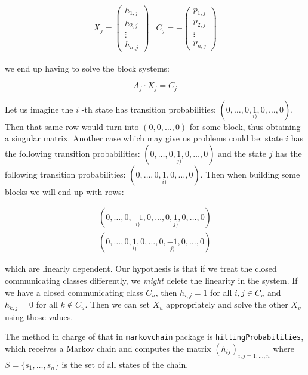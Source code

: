 \documentclass[
  nojss]{jss}
\begin{document}
\begin{equation*}
\begin{array}{lr}
X_j = \left(\begin{array}{c}
h_{1,j} \\
h_{2,j} \\
\vdots  \\
h_{n,j}
\end{array}\right) &
C_j = - \left(\begin{array}{c}
p_{1,j} \\
p_{2,j} \\
\vdots  \\
p_{n,j}
\end{array}\right)
\end{array}
\end{equation*}

we end up having to solve the block systems:

\begin{equation}
A_j \cdot X_j = C_j
\end{equation}

Let us imagine the \(i\) -th state has transition probabilities: \((0, \ldots, 0, \underset{i)}{1}, 0, \ldots, 0)\). Then that same row would turn into \((0,0, \ldots, 0)\) for some block, thus obtaining a singular matrix. Another case which may give us problems could be: state \(i\) has the following transition probabilities: \((0, \ldots, 0, \underset{j)}{1}, 0, \ldots, 0)\) and the state \(j\) has the following transition probabilities: \((0, \ldots, 0, \underset{i)}{1}, 0, \ldots, 0)\). Then when building some blocks we will end up with rows:

\begin{eqnarray*}
(0, \ldots, 0, \underset{i)}{-1}, 0, \ldots, 0, \underset{j)}{1}, 0, \ldots, 0) \\
(0, \ldots, 0, \underset{i)}{1},  0, \ldots, 0, \underset{j)}{-1}, 0, \ldots, 0)
\end{eqnarray*}

which are linearly dependent. Our hypothesis is that if we treat the closed communicating classes differently, we \emph{might} delete the linearity in the system. If we have a closed communicating class \(C_u\), then \(h_{i,j} = 1\) for all \(i,j \in C_u\) and \(h_{k,j} = 0\) for all \(k\not\in C_u\). Then we can set \(X_u\) appropriately and solve the other \(X_v\) using those values.

The method in charge of that in \texttt{markovchain} package is \texttt{hittingProbabilities}, which receives a Markov chain and computes the matrix \((h_{ij})_{i,j = 1,\ldots, n}\) where \(S = \{s_1, \ldots, s_n\}\) is the set of all states of the chain.
\end{document}
